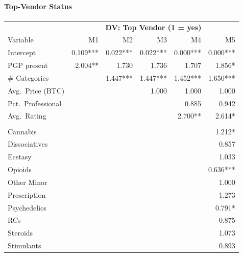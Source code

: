 \documentclass{article}
\begin{document}
\paragraph{Top-Vendor Status}
\begin{table}[htbp]
  \centering
  \scriptsize
  \setlength\tabcolsep{4pt}
  \begin{tabular}{lrrrrr}
    \toprule
    & \multicolumn{5}{c}{\textbf{DV: Top Vendor (1 = yes)}}\\
    \cmidrule(lr){2-6}
    Variable & M1 & M2 & M3 & M4 & M5\\
    \midrule
    Intercept               & 0.109*** & 0.022*** & 0.022*** & 0.000*** & 0.000***\\
    PGP present             & 2.004**  & 1.730     & 1.736     & 1.707     & 1.856*\\
    \# Categories           &          & 1.447***  & 1.447***  & 1.452***  & 1.650***\\
    Avg.\ Price (BTC)       &          &           & 1.000     & 1.000     & 1.000\\
    Pct.\ Professional      &          &           &           & 0.885     & 0.942\\
    Avg.\ Rating            &          &           &           & 2.700**   & 2.614*\\
    \addlinespace
    \multicolumn{6}{l}{\emph{Primary drug class}}\\
    Cannabis                &          &           &           &           & 1.212*\\
    Dissociatives           &          &           &           &           & 0.857\\
    Ecstasy                 &          &           &           &           & 1.033\\
    Opioids                 &          &           &           &           & 0.636***\\
    Other Minor             &          &           &           &           & 1.000\\
    Prescription            &          &           &           &           & 1.273\\
    Psychedelics            &          &           &           &           & 0.791*\\
    RCs                     &          &           &           &           & 0.875\\
    Steroids                &          &           &           &           & 1.073\\
    Stimulants              &          &           &           &           & 0.893\\

\end{tabular}
\end{table}
\end{document}
